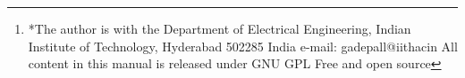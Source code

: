 \documentclass[journal,2pt,twocolumn]{IEEEtran}
\begin{document}
\author{G V V Sharma$^{*}$%
\thanks{*The author is with the Department
of Electrical Engineering, Indian Institute of Technology, Hyderabad
502285 India e-mail:  gadepall@iithacin All content in this manual is released under GNU GPL  Free and open source}%
}
% 
%



% 







\maketitle
\end{document}
